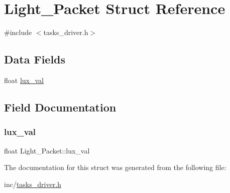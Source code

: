 \hypertarget{struct_light___packet}{}\section{Light\+\_\+\+Packet Struct Reference}
\label{struct_light___packet}


{\ttfamily \#include $<$tasks\+\_\+driver.\+h$>$}

\subsection*{Data Fields}
\begin{DoxyCompactItemize}
\item 
float \mbox{\hyperlink{struct_light___packet_acd3a202eea84fc54123ba7d3dfce49b2}{lux\+\_\+val}}
\end{DoxyCompactItemize}


\subsection{Field Documentation}
\mbox{\label{struct_light___packet_acd3a202eea84fc54123ba7d3dfce49b2}} 
\subsubsection{\texorpdfstring{lux\_val}{lux\_val}}
{\footnotesize\ttfamily float Light\+\_\+\+Packet\+::lux\+\_\+val}



The documentation for this struct was generated from the following file\+:\begin{DoxyCompactItemize}
\item 
inc/\mbox{\hyperlink{tasks__driver_8h}{tasks\+\_\+driver.\+h}}\end{DoxyCompactItemize}
